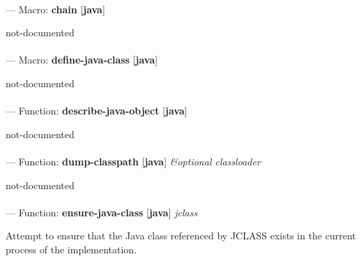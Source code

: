\paragraph{}
\label{JAVA:CHAIN}
--- Macro: \textbf{chain} [\textbf{java}] \textit{}

\begin{adjustwidth}{5em}{5em}
not-documented
\end{adjustwidth}

\paragraph{}
\label{JAVA:DEFINE-JAVA-CLASS}
--- Macro: \textbf{define-java-class} [\textbf{java}] \textit{}

\begin{adjustwidth}{5em}{5em}
not-documented
\end{adjustwidth}

\paragraph{}
\label{JAVA:DESCRIBE-JAVA-OBJECT}
--- Function: \textbf{describe-java-object} [\textbf{java}] \textit{}

\begin{adjustwidth}{5em}{5em}
not-documented
\end{adjustwidth}

\paragraph{}
\label{JAVA:DUMP-CLASSPATH}
--- Function: \textbf{dump-classpath} [\textbf{java}] \textit{\&optional classloader}

\begin{adjustwidth}{5em}{5em}
not-documented
\end{adjustwidth}

\paragraph{}
\label{JAVA:ENSURE-JAVA-CLASS}
--- Function: \textbf{ensure-java-class} [\textbf{java}] \textit{jclass}

\begin{adjustwidth}{5em}{5em}
Attempt to ensure that the Java class referenced by JCLASS exists in the current process of the implementation.
\end{adjustwidth}

